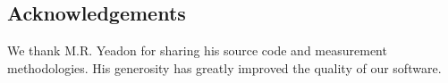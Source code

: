 \documentclass[10pt,a4paper,twocolumn]{article}
\begin{document}
\subsection*{Acknowledgements}
We thank M.R. Yeadon for sharing his source code and measurement methodologies.
His generosity has greatly improved the quality of our software.

{\small
}



\end{document}
